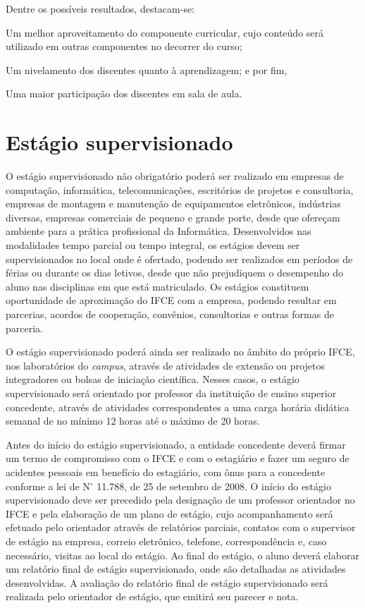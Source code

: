 \documentclass[
	12pt,				%
	openright,			%
	twoside,			%
	a4paper,			%
	chapter=TITLE,		%
	english,			%
	french,				%
	spanish,			%
	brazil,				%
	]{abntex2}
\newcommand{\nord}[1]{N$^\circ$ #1}
\begin{document}
Dentre os possíveis resultados, destacam-se: 
\begin{alineas}
\item Um melhor aproveitamento do componente curricular, cujo conteúdo será utilizado em outras componentes no decorrer do curso;
\item Um nivelamento dos discentes quanto à aprendizagem; e por fim,
\item Uma maior participação dos discentes em sala de aula.
\end{alineas}



\chapter{Estágio supervisionado}

O estágio supervisionado não obrigatório poderá ser realizado em empresas de computação, informática, telecomunicações, escritórios de projetos e consultoria, empresas de montagem e manutenção de equipamentos eletrônicos, indústrias diversas, empresas comerciais de pequeno e grande porte, desde que ofereçam ambiente para a prática profissional da Informática.  Desenvolvidos nas modalidades tempo parcial ou tempo integral, os estágios devem ser supervisionados no local onde é ofertado, podendo ser realizados em períodos de férias ou durante os dias letivos, desde que não prejudiquem o desempenho do aluno nas disciplinas em que está matriculado.
Os estágios constituem oportunidade de aproximação do IFCE com a empresa, podendo resultar em parcerias, acordos de cooperação, convênios, consultorias e outras formas de parceria.


O estágio supervisionado poderá ainda ser realizado no âmbito do próprio IFCE, nos laboratórios do \textit{campus}, através de atividades de extensão ou projetos integradores ou bolsas de iniciação científica. Nesses casos, o estágio supervisionado será orientado por professor da instituição de ensino superior concedente, através de atividades correspondentes a uma carga horária didática semanal de no mínimo 12 horas até o máximo de 20 horas.

Antes do início do estágio supervisionado, a entidade concedente deverá firmar um termo de compromisso com o IFCE e com o estagiário e fazer um seguro de acidentes pessoais em benefício do estagiário, com ônus para a concedente conforme a lei de \nord{11.788}, de 25 de setembro de 2008. O início do estágio supervisionado deve ser precedido pela designação de um professor orientador no IFCE e pela elaboração de um plano de estágio, cujo acompanhamento será efetuado pelo orientador através de relatórios parciais, contatos com o supervisor de estágio na empresa, correio eletrônico, telefone, correspondência e, caso necessário, visitas ao local do estágio. Ao final do estágio, o aluno deverá elaborar um relatório final de estágio supervisionado, onde são detalhadas as atividades desenvolvidas. A avaliação do relatório final de estágio supervisionado será realizada pelo orientador de estágio, que emitirá seu parecer e nota. 
\end{document}
